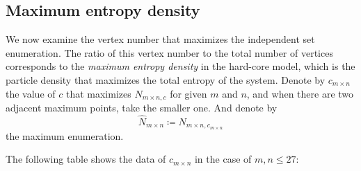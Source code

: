 \documentclass[11pt]{article}
\begin{document}
    \subsection{Maximum entropy density}

    We now examine the vertex number that maximizes the independent set enumeration.
    The ratio of this vertex number to the total number of vertices corresponds to the \textit{maximum entropy density} in the hard-core model,
    which is the particle density that maximizes the total entropy of the system.
    Denote by $c_{m\times n}$ the value of $c$ that maximizes $N_{m\times n, c}$ for given $m$ and $n$, and when there are two adjacent maximum points, take the smaller one.
    And denote by
    \[
        \hat{N}_{m\times n}\coloneq N_{m \times n, c_{m\times n}}
    \]
    the maximum enumeration.

    The following table shows the data of $c_{m\times n}$ in the case of $m, n\leq 27$:
\end{document}

